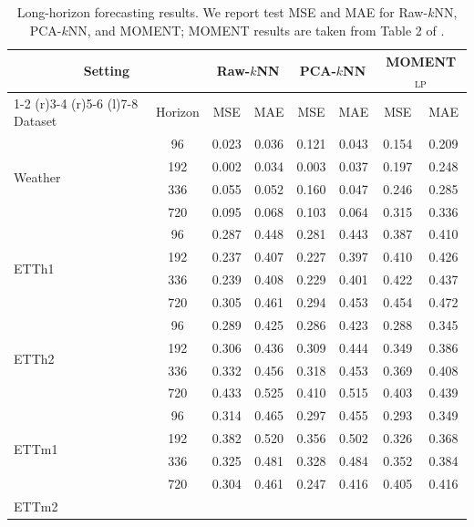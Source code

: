 \documentclass[12pt]{article}
\theoremstyle{definition}
\begin{document}
\begin{table}
  \caption{Long-horizon forecasting results. We report test MSE and MAE for Raw-$k$NN, PCA-$k$NN, and MOMENT; MOMENT results are taken from Table 2 of \cite{goswami2024moment}.}
  \label{tab:long_horizon_results}
  \centering
  \footnotesize
  \begin{tabular}{@{}lccccccc@{}}
    \toprule
    \multicolumn{2}{c}{Setting} &
    \multicolumn{2}{c}{Raw-$k$NN} &
    \multicolumn{2}{c}{PCA-$k$NN} &
    \multicolumn{2}{c}{MOMENT$_{\mathrm{LP}}$} \\
    \cmidrule(r){1-2}
    \cmidrule(r){3-4}
    \cmidrule(r){5-6}
    \cmidrule(l){7-8}
    Dataset & Horizon & MSE & MAE & MSE & MAE & MSE & MAE \\
    \midrule
    \multirow{4}{*}{Weather}
      & 96  & 0.023 & 0.036 & 0.121 & 0.043 & 0.154 & 0.209 \\
      & 192 & 0.002 & 0.034 & 0.003 & 0.037 & 0.197 & 0.248 \\
      & 336 & 0.055 & 0.052 & 0.160 & 0.047 & 0.246 & 0.285 \\
      & 720 & 0.095 & 0.068 & 0.103 & 0.064 & 0.315 & 0.336 \\
    \midrule
    \multirow{4}{*}{ETTh1}
      & 96  & 0.287 & 0.448 & 0.281 & 0.443 & 0.387 & 0.410 \\
      & 192 & 0.237 & 0.407 & 0.227 & 0.397 & 0.410 & 0.426 \\
      & 336 & 0.239 & 0.408 & 0.229 & 0.401 & 0.422 & 0.437 \\
      & 720 & 0.305 & 0.461 & 0.294 & 0.453 & 0.454 & 0.472 \\
    \midrule
    \multirow{4}{*}{ETTh2}
      & 96  & 0.289 & 0.425 & 0.286 & 0.423 & 0.288 & 0.345 \\
      & 192 & 0.306 & 0.436 & 0.309 & 0.444 & 0.349 & 0.386 \\
      & 336 & 0.332 & 0.456 & 0.318 & 0.453 & 0.369 & 0.408 \\
      & 720 & 0.433 & 0.525 & 0.410 & 0.515 & 0.403 & 0.439 \\
    \midrule
    \multirow{4}{*}{ETTm1}
      & 96  & 0.314 & 0.465 & 0.297 & 0.455 & 0.293 & 0.349 \\
      & 192 & 0.382 & 0.520 & 0.356 & 0.502 & 0.326 & 0.368 \\
      & 336 & 0.325 & 0.481 & 0.328 & 0.484 & 0.352 & 0.384 \\
      & 720 & 0.304 & 0.461 & 0.247 & 0.416 & 0.405 & 0.416 \\
    \midrule
    \multirow{4}{*}{ETTm2}

\end{tabular}
\end{table}
\end{document}
